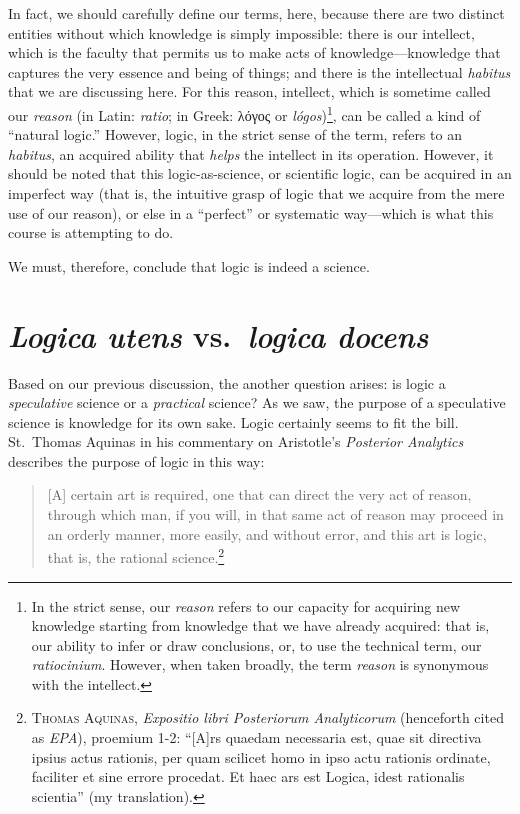 \documentclass[
  12pt,
]{memoir}
\begin{document}
In fact, we should carefully define our terms, here, because there are
two distinct entities without which knowledge is simply impossible:
there is our intellect, which is the faculty that permits us to make
acts of knowledge---knowledge that captures the very essence and being
of things; and there is the intellectual \emph{habitus} that we are
discussing here. For this reason, intellect, which is sometime called
our \emph{reason} (in Latin: \emph{ratio}; in Greek: λόγος or
\emph{lógos})\footnote{In the strict sense, our \emph{reason} refers to
  our capacity for acquiring new knowledge starting from knowledge that
  we have already acquired: that is, our ability to infer or draw
  conclusions, or, to use the technical term, our \emph{ratiocinium}.
  However, when taken broadly, the term \emph{reason} is synonymous with
  the intellect.}, can be called a kind of ``natural logic.'' However,
logic, in the strict sense of the term, refers to an \emph{habitus}, an
acquired ability that \emph{helps} the intellect in its operation.
However, it should be noted that this logic-as-science, or scientific
logic, can be acquired in an imperfect way (that is, the intuitive grasp
of logic that we acquire from the mere use of our reason), or else in a
``perfect'' or systematic way---which is what this course is attempting
to do.

We must, therefore, conclude that logic is indeed a science.

\section{\texorpdfstring{\emph{Logica utens} vs.~\emph{logica
docens}}{Logica utens vs.~logica docens}}\label{logica-utens-vs.-logica-docens}

Based on our previous discussion, the another question arises: is logic
a \emph{speculative} science or a \emph{practical} science? As we saw,
the purpose of a speculative science is knowledge for its own sake.
Logic certainly seems to fit the bill. St.~Thomas Aquinas in his
commentary on Aristotle's \emph{Posterior Analytics} describes the
purpose of logic in this way:

\begin{quote}
{[}A{]} certain art is required, one that can direct the very act of
reason, through which man, if you will, in that same act of reason may
proceed in an orderly manner, more easily, and without error, and this
art is logic, that is, the rational science.\footnote{\textsc{Thomas
  Aquinas}, \emph{Expositio libri Posteriorum Analyticorum} (henceforth
  cited as \emph{EPA}), proemium 1-2: ``{[}A{]}rs quaedam necessaria
  est, quae sit directiva ipsius actus rationis, per quam scilicet homo
  in ipso actu rationis ordinate, faciliter et sine errore procedat. Et
  haec ars est Logica, idest rationalis scientia'' (my translation).}
\end{quote}
\end{document}
